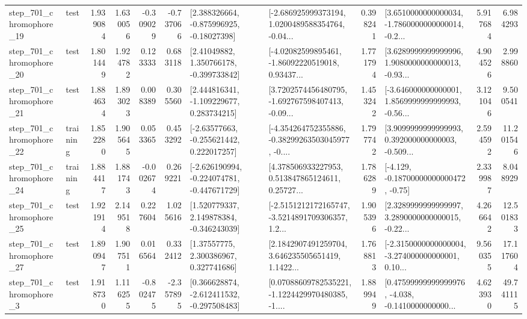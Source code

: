 \begin{tabular}{llrrrrllrlrr}
  step\_701\_chromophore\_19 &      test &      1.939084 &    1.630056 &     -0.309029 & -0.737066 &    [2.388326664, -0.875996925, -0.18027398] &  [-2.686925999373194, 1.0200489588354764, -0.04... &       0.398241 &  [3.6510000000000034, -1.7860000000000014, -0.2... &            5.917684 &          6.984293 \\
  step\_701\_chromophore\_20 &      test &      1.801449 &    1.924782 &      0.123333 &  0.683118 &     [2.41049882, 1.350766178, -0.399733842] &  [-4.02082599895461, -1.86092220519018, 0.93437... &       1.771794 &  [3.6289999999999996, 1.9080000000000013, -0.93... &            4.904526 &          2.998860 \\
  step\_701\_chromophore\_21 &      test &      1.884634 &    1.893023 &      0.008389 &  0.305560 &    [2.444816341, -1.109229677, 0.283734215] &  [3.7202574456480795, -1.692767598407413, -0.09... &       1.453242 &  [-3.646000000000001, 1.8569999999999993, -0.56... &            3.121046 &          9.500541 \\
  step\_701\_chromophore\_22 &  training &      1.852280 &    1.905645 &      0.053365 &  0.453292 &    [-2.63577663, -0.255621442, 0.222017257] &  [-4.354264752355886, -0.38299263503045977, -0.... &       1.797742 &  [3.9099999999999993, 0.392000000000003, -0.509... &            2.594592 &         11.201546 \\
  step\_701\_chromophore\_24 &  training &      1.884417 &    1.881743 &     -0.002674 &  0.269221 &  [-2.626190994, -0.224074781, -0.447671729] &  [4.378506933227953, 0.513847865124611, 0.25727... &       1.786289 &              [-4.129, -0.18700000000000472, -0.75] &            2.339987 &          8.048929 \\
  step\_701\_chromophore\_25 &      test &      1.921914 &    2.149518 &      0.227604 &  1.025616 &    [1.520779337, 2.149878384, -0.346243039] &  [-2.5151212172165747, -3.5214891709306357, 1.2... &       1.905396 &  [2.3289999999999997, 3.2890000000000015, -0.22... &            4.266642 &         12.501833 \\
  step\_701\_chromophore\_27 &      test &      1.890947 &    1.907511 &      0.016564 &  0.332412 &      [1.37557775, 2.300386967, 0.327741686] &  [2.1842907491259704, 3.646235505651419, 1.1422... &       1.768813 &  [-2.3150000000000004, -3.274000000000001, 0.10... &            9.560355 &         17.117604 \\
   step\_701\_chromophore\_3 &      test &      1.918730 &    1.116255 &     -0.802475 & -2.357895 &   [0.366628874, -2.612411532, -0.297508483] &  [0.07088609782535221, -1.1224429970480385, -1.... &       1.889949 &  [0.47599999999999976, -4.038, -0.1410000000000... &            4.623930 &         49.741115 \\

\end{tabular}
